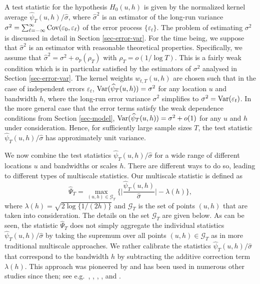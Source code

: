 A test statistic for the hypothesis $H_0(u,h)$ is given by the normalized kernel average $\widehat{\psi}_T(u,h)/\widehat{\sigma}$, where $\widehat{\sigma}^2$ is an estimator of the long-run variance $\sigma^2 = \sum\nolimits_{\ell=-\infty}^{\infty} \textnormal{Cov}(\varepsilon_0,\varepsilon_\ell)$ of the error process $\{\varepsilon_t\}$. The problem of estimating $\sigma^2$ is discussed in detail in Section \ref{sec-error-var}. For the time being, we suppose that $\widehat{\sigma}^2$ is an estimator with reasonable theoretical properties. Specifically, we assume that $\widehat{\sigma}^2 = \sigma^2 + o_p(\rho_T)$ with $\rho_T = o(1/\log T)$. This is a fairly weak condition which is in particular satisfied by the estimators of $\sigma^2$ analysed in Section \ref{sec-error-var}. The kernel weights $w_{t,T}(u,h)$ are chosen such that in the case of independent errors $\varepsilon_t$, $\textnormal{Var}(\widehat{\psi}_T(u,h)) = \sigma^2$ for any location $u$ and bandwidth $h$, where the long-run error variance $\sigma^2$ simplifies to $\sigma^2 = \textnormal{Var}(\varepsilon_t)$. In the more general case that the error terms satisfy the weak dependence conditions from Section \ref{sec-model}, $\textnormal{Var}(\widehat{\psi}_T(u,h)) = \sigma^2 + o(1)$ for any $u$ and $h$ under consideration. Hence, for sufficiently large sample sizes $T$, the test statistic $\widehat{\psi}_T(u,h)/\widehat{\sigma}$ has approximately unit variance.


We now combine the test statistics $\widehat{\psi}_T(u,h)/\widehat{\sigma}$ for a wide range of different locations $u$ and bandwidths or scales $h$. There are different ways to do so, leading to different types of multiscale statistics. Our multiscale statistic is defined as
\begin{equation}\label{multiscale-stat}
\widehat{\Psi}_T = \max_{(u,h) \in \mathcal{G}_T} \Big\{ \Big|\frac{\widehat{\psi}_T(u,h)}{\widehat{\sigma}}\Big| - \lambda(h) \Big\}, 
\end{equation} 
where $\lambda(h) = \sqrt{2 \log \{ 1/(2h) \}}$ and $\mathcal{G}_T$ is the set of points $(u,h)$ that are taken into consideration. The details on the set $\mathcal{G}_T$ are given below. As can be seen, the statistic $\widehat{\Psi}_T$ does not simply aggregate the individual statistics $\widehat{\psi}_T(u,h)/\widehat{\sigma}$ by taking the supremum over all points $(u,h) \in \mathcal{G}_T$ as in more traditional multiscale approaches. We rather calibrate the statistics $\widehat{\psi}_T(u,h)/\widehat{\sigma}$ that correspond to the bandwidth $h$ by subtracting the additive correction term $\lambda(h)$. This approach was pioneered by \cite{DuembgenSpokoiny2001} and has been used in numerous other studies since then; see e.g.\ \cite{Duembgen2002}, \cite{Rohde2008}, \cite{DuembgenWalther2008}, \cite{RufibachWalther2010}, \cite{SchmidtHieber2013} and \cite{EckleBissantzDette2017}. 


